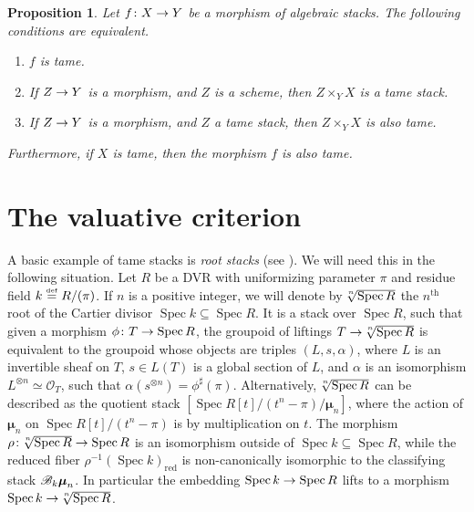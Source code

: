 \documentclass{amsart}
\numberwithin{equation}{section}
\numberwithin{subsection}{section}
\newenvironment{enumerate1}
{\begin{enumerate}[\upshape (1)]}
{\end{enumerate}}
\newtheorem{proposition}[theorem]{Proposition}
\theoremstyle{definition}
\theoremstyle{remark}
\renewcommand{\mathcal}{\mathscr}
\newcommand\cO{\mathcal{O}} \newcommand\cP{\mathcal{P}}
\newcommand\arr{\ifinner\to\else\longrightarrow\fi}
\newcommand{\eqdef}{\mathrel{\smash{\overset{\mathrm{\scriptscriptstyle def}} =}}}
\renewcommand\th{^\text{th}}
\newcommand\spec{\operatorname{Spec}}
\newcommand{\mmu}{\boldsymbol{\mu}}
\newcommand\radice[2][\relax]{\hspace{-1.5pt}\sqrt[\uproot{2}#1]{#2}}
\begin{document}
\begin{proposition}
Let $f\colon X \arr Y$ be a morphism of algebraic stacks. The following conditions are equivalent.

\begin{enumerate1}

\item $f$ is tame.

\item If $Z \arr Y$ is a morphism, and $Z$ is a scheme, then $Z \times_{Y}X$ is a tame stack.

\item If $Z \arr Y$ is a morphism, and $Z$ a tame stack, then $Z \times_{Y}X$ is also tame.

\end{enumerate1}

Furthermore, if $X$ is tame, then the morphism $f$ is also tame.
\end{proposition}

\section{The valuative criterion}\label{sec:valuative}

A basic example of tame stacks is \emph{root stacks} (see \cite[Appendix~B2]{dan-tom-angelo2008}). We will need this in the following situation. Let $R$ be a DVR with uniformizing parameter $\pi$ and residue field $k \eqdef R/(\pi)$. If $n$ is a positive integer, we will denote by $\radice[n]{\spec R}$ the $n\th$ root of the Cartier divisor $\spec k\subseteq \spec R$. It is a stack over $\spec R$, such that given a morphism $\phi\colon T \arr \spec R$, the groupoid of liftings $T \arr \radice[n]{\spec R}$ is equivalent to the groupoid whose objects are triples $(L, s, \alpha)$, where $L$ is an invertible sheaf on $T$, $s \in L(T)$ is a global section of $L$, and $\alpha$ is an isomorphism $L^{\otimes n} \simeq \cO_{T}$, such that $\alpha(s^{\otimes n}) = \phi^\sharp(\pi)$. Alternatively, $\radice[n]{\spec R}$ can be described as the quotient stack $[\spec R[t]/(t^{n} - \pi)/\mmu_{n}]$, where the action of $\mmu_{n}$ on $\spec R[t]/(t^{n} - \pi)$ is by multiplication on $t$. The morphism $\rho\colon \radice[n]{\spec R} \arr \spec R$ is an isomorphism outside of $\spec k \subseteq \spec R$, while the reduced fiber $\rho^{-1}(\spec k)_{\mathrm{red}}$ is non-canonically isomorphic to the classifying stack $\cB_{k}\mmu_{n}$. In particular the embedding $\spec k \arr \spec R$ lifts to a morphism $\spec k \arr \radice[n]{\spec R}$.
\end{document}
